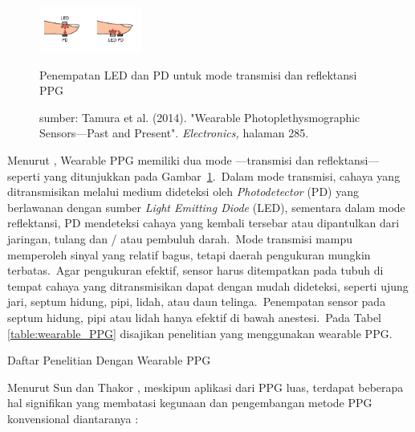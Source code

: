 \begin{figure}[ht]
	\centering
	\includegraphics[width=0.3\textwidth]{finger}
	\caption{Penempatan LED dan PD untuk mode transmisi dan reflektansi PPG}
	\caption*{sumber: Tamura et al. (2014). "Wearable Photoplethysmographic Sensors—Past and Present". \textit{Electronics,} halaman 285.}
	\label{fig:finger}   
\end{figure}

Menurut \citet{Tamura2014}, Wearable PPG memiliki dua mode ---transmisi dan reflektansi--- seperti yang ditunjukkan pada Gambar~\ref{fig:finger}.~Dalam mode transmisi, cahaya yang ditransmisikan melalui medium dideteksi oleh \textit{Photodetector} (PD) yang berlawanan dengan sumber \textit{Light Emitting Diode} (LED), sementara dalam mode reflektansi, PD mendeteksi cahaya yang kembali tersebar atau dipantulkan dari jaringan, tulang dan / atau pembuluh darah.~Mode transmisi mampu memperoleh sinyal yang relatif bagus, tetapi daerah pengukuran mungkin terbatas.~Agar pengukuran efektif, sensor harus ditempatkan pada tubuh di tempat cahaya yang ditransmisikan dapat dengan mudah dideteksi, seperti ujung jari, septum hidung, pipi, lidah, atau daun telinga.~Penempatan sensor pada septum hidung, pipi atau lidah hanya efektif di bawah anestesi.~Pada Tabel \ref{table:wearable_PPG} disajikan penelitian yang menggunakan wearable PPG.

\begin{table}[ht]
	\vspace{0.3em}
	\caption{Daftar Penelitian Dengan Wearable PPG}
	\centering
	\label{table:wearable_PPG}
	\caption*{sumber: Sun, Y. and Thakor, N. (2016). "Photoplethysmography revisited: from contact to noncontact, from point to imaging". \textit{IEEE Transactions on Biomedical Engineering,} Vol.~63, No. 3, halaman 466.}
\end{table}
Menurut Sun dan Thakor \citep{sun2016}, meskipun aplikasi dari PPG luas, terdapat beberapa hal signifikan yang membatasi kegunaan dan pengembangan metode PPG konvensional diantaranya :

